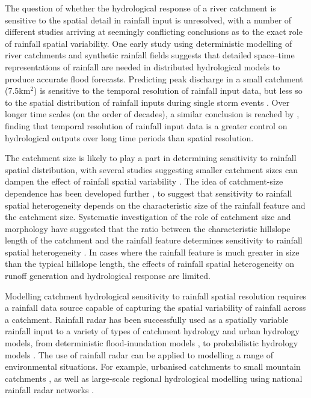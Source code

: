 The question of whether the hydrological response of a river catchment is sensitive to the spatial detail in rainfall input  is unresolved, with a number of different studies arriving at seemingly conflicting conclusions as to the exact role of rainfall spatial variability. One early study using deterministic modelling of river catchments and synthetic rainfall fields \citep{wilson1979influence} suggests that detailed space--time representations of rainfall are needed in distributed hydrological models to produce accurate flood forecasts. Predicting peak discharge in a small catchment (7.5km\(^2\)) is sensitive to the temporal resolution of rainfall input data, but less so to the spatial distribution of rainfall inputs during single storm events  \citep{krajewski1991monte}. Over longer time scales (on the order of decades), a similar conclusion is reached by \citet{coulthard2016sensitivity}, finding that temporal resolution of rainfall input data is a greater control on hydrological outputs over long time periods than spatial resolution. 

The catchment size is likely to play a part in determining sensitivity to rainfall spatial distribution, with several studies suggesting smaller catchment sizes can dampen the effect of rainfall spatial variability \citep{segond2007simulation,nicotina2008impact}. The idea of catchment-size dependence has been developed further \citep{gabellani2007propagation}, to suggest that sensitivity to rainfall spatial heterogeneity depends on the characteristic size of the rainfall feature and the catchment size. Systematic investigation of the role of catchment size and morphology have suggested that the ratio between the characteristic hillslope length of the catchment and the rainfall feature determines sensitivity to rainfall spatial heterogeneity \citep{nicotina2008impact}. In cases where the rainfall feature is much greater in size than the typical hillslope length, the effects of rainfall spatial heterogeneity on runoff generation and hydrological response are limited. 

Modelling catchment hydrological sensitivity to rainfall spatial resolution requires a rainfall data source capable of capturing the spatial variability of rainfall across a catchment. Rainfall radar has been successfully used as a spatially variable rainfall input to a variety of types of catchment hydrology and urban hydrology models, from deterministic flood-inundation models \citep[e.g][]{coulthard2016sensitivity}, to probabilistic hydrology models \citep{bell2000sensitivity,cole2008hydrological}. The use of rainfall radar can be applied to modelling a range of environmental situations. For example, urbanised catchments \citep{berne2004temporal,einfalt2004towards,thorndahl2014analyses} to small mountain catchments \citep{borga2000use}, as well as large-scale regional hydrological modelling using national rainfall radar networks \citep{knebl2005regional}.

